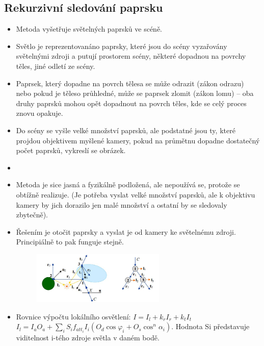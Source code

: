 \subsection{Rekurzivní sledování paprsku}
\begin{itemize}
 \item Metoda vyšetřuje  světelných paprsků ve scéně.
 \item Světlo je reprezentovanáno paprsky, které jsou do scény vyzařovány světelnými zdroji a putují prostorem scény, některé dopadnou na povrchy těles, jiné odletí ze scény.
 \item Paprsek, který dopadne na povrch tělesa se může odrazit (zákon odrazu) nebo pokud je těleso průhledné, může se paprsek zlomit (zákon lomu) -- oba druhy paprsků mohou opět dopadnout na povrch těles, kde se celý proces znovu opakuje. %
 \item Do scény se vyšle velké množství paprsků, ale podstatné jsou ty, které projdou objektivem myšlené kamery, pokud na průmětnu dopadne dostatečný počet paprsků, vykreslí se obrázek.
\item
\item Metoda je sice jasná a fyzikálně podložená, ale nepoužívá se, protože se obtížně realizuje. (Je potřeba vyslat velké množství paprsků, ale k objektivu kamery by jich dorazilo jen malé množství a ostatní by se sledovaly zbytečně). 
\item Řešením je otočit paprsky a vyslat je od kamery ke světelnému zdroji. Principiálně to pak funguje stejně.
 \begin{figure}[H]
		\centering
		\includegraphics[width=0.6\textwidth]{assets/6_rekurzivni_sledovani_paprsku}
\end{figure}
 \item Rovnice výpočtu lokálního osvětlení: $I = I_l + k_rI_r + k_tI_t$ \\
  $I_l = I_aO_a + \sum\limits_{i} S_if_{att_i}I_i(O_d \cos{\varphi_i} + O_s \cos^n{\alpha_i} )$.
	Hodnota Si představuje viditelnost i-tého zdroje světla v daném bodě.
\end{itemize}
